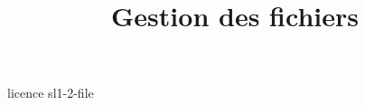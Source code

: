\documentclass {beamer}
\title {Gestion des fichiers}
\begin{document}
 {licence}
 {sl1-2-file}
\end{document}
